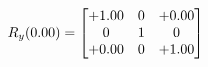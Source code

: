 \documentclass[preview]{standalone}
\begin{document}
\begin{align*}
\special{dvisvgm:raw <g id='unique000'>}R_{y}(0.00) = \begin{bmatrix}+1.00 & 0 & +0.00 \\0 & 1 & 0 \\+0.00 & 0 & +1.00\end{bmatrix}\special{dvisvgm:raw </g>}
\end{align*}
\end{document}
